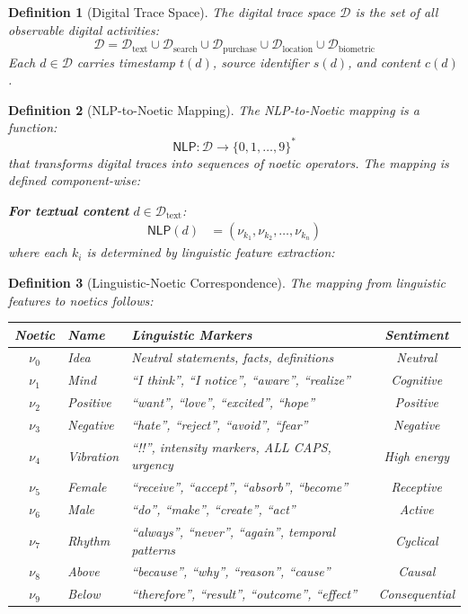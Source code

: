 \documentclass[11pt,twoside]{book}
\renewcommand{\arraystretch}{1.2}
\newcommand{\noe}[1]{\nu_{#1}}
\newcommand{\NLP}{\mathsf{NLP}}
\newcommand{\DigitalTrace}{\mathcal{D}}
\newtheorem{definition}{Definition}[chapter]
\begin{document}
\begin{definition}[Digital Trace Space]
\label{def:digital-trace}
The \emph{digital trace space} $\DigitalTrace$ is the set of all observable digital activities:
\[
    \DigitalTrace = \DigitalTrace_{\text{text}} \cup \DigitalTrace_{\text{search}} \cup \DigitalTrace_{\text{purchase}} \cup \DigitalTrace_{\text{location}} \cup \DigitalTrace_{\text{biometric}}
\]
Each $d \in \DigitalTrace$ carries timestamp $t(d)$, source identifier $s(d)$, and content $c(d)$.
\end{definition}

\begin{definition}[NLP-to-Noetic Mapping]
\label{def:nlp-noetic-map}
The \emph{NLP-to-Noetic mapping} is a function:
\[
    \NLP : \DigitalTrace \longrightarrow \{0, 1, \ldots, 9\}^*
\]
that transforms digital traces into sequences of noetic operators. The mapping is defined component-wise:

\textbf{For textual content} $d \in \DigitalTrace_{\text{text}}$:
\begin{align}
    \NLP(d) &= \left( \noe{k_1}, \noe{k_2}, \ldots, \noe{k_n} \right)
\end{align}
where each $k_i$ is determined by linguistic feature extraction:
\end{definition}

\begin{definition}[Linguistic-Noetic Correspondence]
\label{def:linguistic-noetic}
The mapping from linguistic features to noetics follows:

\begin{center}
\small
\renewcommand{\arraystretch}{1.3}
\begin{tabularx}{\textwidth}{c|l|X|c}
\toprule
\textbf{Noetic} & \textbf{Name} & \textbf{Linguistic Markers} & \textbf{Sentiment} \\
\midrule
$\noe{0}$ & Idea & Neutral statements, facts, definitions & Neutral \\
$\noe{1}$ & Mind & ``I think'', ``I notice'', ``aware'', ``realize'' & Cognitive \\
$\noe{2}$ & Positive & ``want'', ``love'', ``excited'', ``hope'' & Positive \\
$\noe{3}$ & Negative & ``hate'', ``reject'', ``avoid'', ``fear'' & Negative \\
$\noe{4}$ & Vibration & ``!!'', intensity markers, ALL CAPS, urgency & High energy \\
$\noe{5}$ & Female & ``receive'', ``accept'', ``absorb'', ``become'' & Receptive \\
$\noe{6}$ & Male & ``do'', ``make'', ``create'', ``act'' & Active \\
$\noe{7}$ & Rhythm & ``always'', ``never'', ``again'', temporal patterns & Cyclical \\
$\noe{8}$ & Above & ``because'', ``why'', ``reason'', ``cause'' & Causal \\
$\noe{9}$ & Below & ``therefore'', ``result'', ``outcome'', ``effect'' & Consequential \\
\bottomrule
\end{tabularx}
\end{center}
\end{definition}
\end{document}
